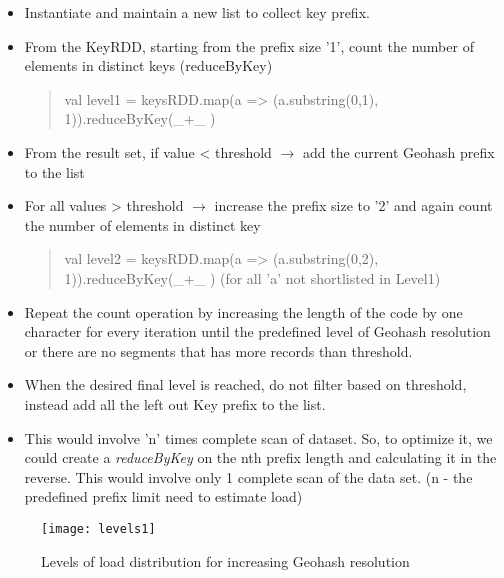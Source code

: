 \documentclass[article,type=msc,colorback,12pt,accentcolor=tud1d]{tudthesis}
\begin{document}
				\begin{itemize}
					\item Instantiate and maintain a new list to collect key prefix.
					
					\item From the KeyRDD, starting from the prefix size '1', count the number of elements in distinct keys (reduceByKey)
						\begin{quote} val level1 = keysRDD.map(a => (a.substring(0,1), 1)).reduceByKey(\_+\_ )
						\end{quote}
						
					\item From the result set, if value < threshold $\to$ add the current Geohash prefix to the list 
					
					\item For all values > threshold $\to$ increase the prefix size to '2' and again count the number of elements in distinct key
						\begin{quote} val level2 = keysRDD.map(a => (a.substring(0,2), 1)).reduceByKey(\_+\_ ) 
							 (for all 'a' not shortlisted in Level1)
							 
						\end{quote}
				 
					\item Repeat the count operation by increasing the length of the code by one character for every iteration until the predefined level of Geohash resolution or there are no segments that has more records than threshold. 
					\item When the desired final level is reached, do not filter based on threshold, instead add all the left out Key prefix to the list.
					\item This would involve 'n' times complete scan of dataset. So, to optimize it, we could create a \textit{reduceByKey} on the nth prefix length and calculating it in the reverse. This would involve only 1 complete scan of the data set. (n - the predefined prefix limit need to estimate load)
			 	
				\end{itemize}
															
				\begin{figure}[h]
					\centering
					\texttt{[image: levels1]}
					\caption{Levels of load distribution for increasing Geohash resolution}
					\label{fig:loadlevels}
				\end{figure}
			
			\clearpage						
				
\end{document}
